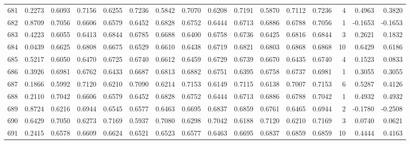 \begin{tabular}{lrrrrrrrrrrrrrrr}
681 &      0.2273 &  0.6093 &  0.7156 &  0.6255 &  0.7236 &  0.5842 &  0.7070 &  0.6208 &  0.7191 &  0.5870 &   0.7112 &     0.7236 &      4 &                    0.4963 &                     0.3820 \\
682 &      0.8709 &  0.7056 &  0.6606 &  0.6579 &  0.6452 &  0.6828 &  0.6752 &  0.6444 &  0.6713 &  0.6886 &   0.6788 &     0.7056 &      1 &                   -0.1653 &                    -0.1653 \\
683 &      0.4223 &  0.6055 &  0.6413 &  0.6844 &  0.6785 &  0.6688 &  0.6400 &  0.6758 &  0.6736 &  0.6425 &   0.6816 &     0.6844 &      3 &                    0.2621 &                     0.1832 \\
684 &      0.0439 &  0.6625 &  0.6808 &  0.6675 &  0.6529 &  0.6610 &  0.6438 &  0.6719 &  0.6821 &  0.6803 &   0.6868 &     0.6868 &     10 &                    0.6429 &                     0.6186 \\
685 &      0.5217 &  0.6050 &  0.6470 &  0.6725 &  0.6740 &  0.6612 &  0.6459 &  0.6729 &  0.6739 &  0.6670 &   0.6435 &     0.6740 &      4 &                    0.1523 &                     0.0833 \\
686 &      0.3926 &  0.6981 &  0.6762 &  0.6433 &  0.6687 &  0.6813 &  0.6882 &  0.6751 &  0.6395 &  0.6758 &   0.6737 &     0.6981 &      1 &                    0.3055 &                     0.3055 \\
687 &      0.1866 &  0.5992 &  0.7120 &  0.6210 &  0.7090 &  0.6214 &  0.7153 &  0.6149 &  0.7115 &  0.6138 &   0.7007 &     0.7153 &      6 &                    0.5287 &                     0.4126 \\
688 &      0.2110 &  0.7042 &  0.6606 &  0.6579 &  0.6452 &  0.6828 &  0.6752 &  0.6444 &  0.6713 &  0.6886 &   0.6788 &     0.7042 &      1 &                    0.4932 &                     0.4932 \\
689 &      0.8724 &  0.6216 &  0.6944 &  0.6545 &  0.6577 &  0.6463 &  0.6695 &  0.6837 &  0.6859 &  0.6761 &   0.6465 &     0.6944 &      2 &                   -0.1780 &                    -0.2508 \\
690 &      0.6429 &  0.7050 &  0.6273 &  0.7169 &  0.5937 &  0.7080 &  0.6298 &  0.7042 &  0.6188 &  0.7120 &   0.6210 &     0.7169 &      3 &                    0.0740 &                     0.0621 \\
691 &      0.2415 &  0.6578 &  0.6609 &  0.6624 &  0.6521 &  0.6523 &  0.6577 &  0.6463 &  0.6695 &  0.6837 &   0.6859 &     0.6859 &     10 &                    0.4444 &                     0.4163 \\

\end{tabular}
